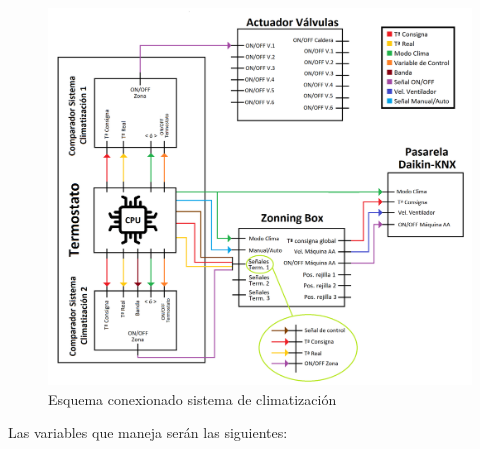  \begin{center}
\begin{figure}[H]
\includegraphics[width=1\textwidth]{figures/prog_termost.png}   
\caption{Esquema conexionado sistema de climatización}
\label{fig:prog_termost}
\end{figure}
\end{center}
Las variables que maneja serán las siguientes: 
